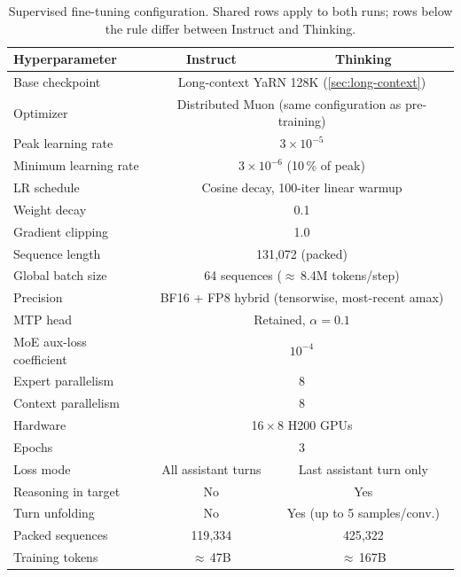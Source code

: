 \documentclass[11pt,a4paper]{article}
\newcommand{\tableheadercolor}{}
\begin{document}
\begin{table}[H]
  \centering
  \caption{Supervised fine-tuning configuration. Shared rows apply to both
  runs; rows below the rule differ between Instruct and Thinking.}
  \label{tab:sft-hyperparams}
  \small
  \begin{tabular}{@{}lcc@{}}
    \toprule
    \tableheadercolor
    \textbf{Hyperparameter} & \textbf{Instruct} & \textbf{Thinking} \\
    \midrule
    Base checkpoint        & \multicolumn{2}{c}{Long-context YaRN 128K (\cref{sec:long-context})} \\
    Optimizer              & \multicolumn{2}{c}{Distributed Muon (same configuration as pre-training)} \\
    Peak learning rate     & \multicolumn{2}{c}{$3 \times 10^{-5}$} \\
    Minimum learning rate  & \multicolumn{2}{c}{$3 \times 10^{-6}$ (10\,\% of peak)} \\
    LR schedule            & \multicolumn{2}{c}{Cosine decay, 100-iter linear warmup} \\
    Weight decay           & \multicolumn{2}{c}{0.1} \\
    Gradient clipping      & \multicolumn{2}{c}{1.0} \\
    Sequence length        & \multicolumn{2}{c}{131{,}072 (packed)} \\
    Global batch size      & \multicolumn{2}{c}{64 sequences ($\approx$\,8.4M tokens/step)} \\
    Precision              & \multicolumn{2}{c}{BF16 + FP8 hybrid (tensorwise, most-recent amax)} \\
    MTP head               & \multicolumn{2}{c}{Retained, $\alpha = 0.1$} \\
    MoE aux-loss coefficient & \multicolumn{2}{c}{$10^{-4}$} \\
    Expert parallelism     & \multicolumn{2}{c}{8} \\
    Context parallelism    & \multicolumn{2}{c}{8} \\
    Hardware               & \multicolumn{2}{c}{16\,$\times$\,8 H200 GPUs} \\
    Epochs                 & \multicolumn{2}{c}{3} \\    
    \midrule
    Loss mode                 & All assistant turns & Last assistant turn only \\
    Reasoning in target       & No                  & Yes \\
    Turn unfolding            & No                  & Yes (up to 5 samples/conv.) \\
    Packed sequences          & 119{,}334           & 425{,}322 \\
    Training tokens           & $\approx$\,47B      & $\approx$\,167B \\
    \bottomrule
  \end{tabular}
\end{table}
\end{document}
